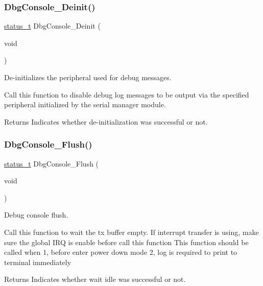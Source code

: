 \subsubsection{\texorpdfstring{DbgConsole\_Deinit()}{DbgConsole\_Deinit()}}
{\footnotesize\ttfamily \mbox{\hyperlink{group__ksdk__common_gaaabdaf7ee58ca7269bd4bf24efcde092}{status\+\_\+t}} Dbg\+Console\+\_\+\+Deinit (\begin{DoxyParamCaption}\item[{void}]{ }\end{DoxyParamCaption})}



De-\/initializes the peripheral used for debug messages. 

Call this function to disable debug log messages to be output via the specified peripheral initialized by the serial manager module.

\begin{DoxyReturn}{Returns}
Indicates whether de-\/initialization was successful or not. 
\end{DoxyReturn}
\mbox{\label{group__debugconsole_ga3194467c3dae6c5015b8b29c3cc1db1e}} 
\subsubsection{\texorpdfstring{DbgConsole\_Flush()}{DbgConsole\_Flush()}}
{\footnotesize\ttfamily \mbox{\hyperlink{group__ksdk__common_gaaabdaf7ee58ca7269bd4bf24efcde092}{status\+\_\+t}} Dbg\+Console\+\_\+\+Flush (\begin{DoxyParamCaption}\item[{void}]{ }\end{DoxyParamCaption})}



Debug console flush. 

Call this function to wait the tx buffer empty. If interrupt transfer is using, make sure the global I\+RQ is enable before call this function This function should be called when 1, before enter power down mode 2, log is required to print to terminal immediately \begin{DoxyReturn}{Returns}
Indicates whether wait idle was successful or not. 
\end{DoxyReturn}
\mbox{\label{group__debugconsole_ga11898c5015274863741c4f3f4d9edc08}} 
